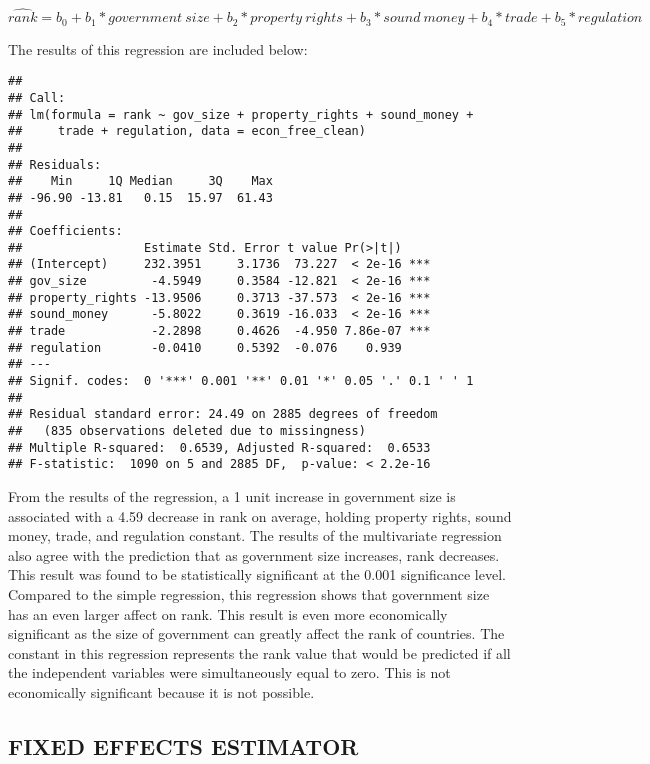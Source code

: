 \documentclass[
  11pt,
]{article}
\begin{document}
\[ \hat{rank} = b_0 + b_1 * government \ size + b_2 * property \ rights + b_3 * sound \ money + b_4 * trade + b_5 * regulation \]

The results of this regression are included below:

\begin{verbatim}
## 
## Call:
## lm(formula = rank ~ gov_size + property_rights + sound_money + 
##     trade + regulation, data = econ_free_clean)
## 
## Residuals:
##    Min     1Q Median     3Q    Max 
## -96.90 -13.81   0.15  15.97  61.43 
## 
## Coefficients:
##                 Estimate Std. Error t value Pr(>|t|)    
## (Intercept)     232.3951     3.1736  73.227  < 2e-16 ***
## gov_size         -4.5949     0.3584 -12.821  < 2e-16 ***
## property_rights -13.9506     0.3713 -37.573  < 2e-16 ***
## sound_money      -5.8022     0.3619 -16.033  < 2e-16 ***
## trade            -2.2898     0.4626  -4.950 7.86e-07 ***
## regulation       -0.0410     0.5392  -0.076    0.939    
## ---
## Signif. codes:  0 '***' 0.001 '**' 0.01 '*' 0.05 '.' 0.1 ' ' 1
## 
## Residual standard error: 24.49 on 2885 degrees of freedom
##   (835 observations deleted due to missingness)
## Multiple R-squared:  0.6539, Adjusted R-squared:  0.6533 
## F-statistic:  1090 on 5 and 2885 DF,  p-value: < 2.2e-16
\end{verbatim}

From the results of the regression, a 1 unit increase in government size
is associated with a 4.59 decrease in rank on average, holding property
rights, sound money, trade, and regulation constant. The results of the
multivariate regression also agree with the prediction that as
government size increases, rank decreases. This result was found to be
statistically significant at the 0.001 significance level. Compared to
the simple regression, this regression shows that government size has an
even larger affect on rank. This result is even more economically
significant as the size of government can greatly affect the rank of
countries. The constant in this regression represents the rank value
that would be predicted if all the independent variables were
simultaneously equal to zero. This is not economically significant
because it is not possible.

\hypertarget{fixed-effects-estimator}{%
\subsection{FIXED EFFECTS ESTIMATOR}\label{fixed-effects-estimator}}
\end{document}
